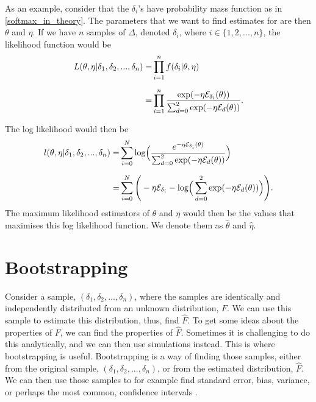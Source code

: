 As an example, consider that the $\delta_i$'s have probability mass function as in \eqref{softmax_in_theory}. The parameters that we want to find estimates for are then $\theta$ and $\eta$. If we have $n$ samples of $\Delta$, denoted $\delta_i$, where $i \in \{1,2,...,n\}$,
the likelihood function would be
\begin{equation*}
    \begin{aligned}
        L(\theta,\eta|\delta_1,\delta_2,...,\delta_n) 
        =& \prod_{i=1}^{n} f(\delta_i|\theta,\eta)\\[6pt]
        =& \prod_{i=1}^{n}
        \frac{\text{exp}(- \eta \mathcal{E}_{\delta_i}(\theta))}{\sum_{d=0}^{2} \text{exp}(-\eta \mathcal{E}_{d}(\theta))}.
    \end{aligned}
\end{equation*}

The log likelihood would then be
\begin{equation*}
    \begin{aligned}
        l(\theta,\eta|\delta_1,\delta_2,...,\delta_n) =& \sum_{i=0}^N \text{log}\Big( \frac{e^{-\eta \mathcal{E}_{\delta_{i}}(\theta)}}
        {\sum_{d=0}^{2} \text{exp}(-\eta \mathcal{E}_{d}(\theta))}\Big) \\[6pt]
        =& \sum_{i=0}^N \Bigg(
        -\eta \mathcal{E}_{\delta_{i}} 
        - \text{log}\Big(\sum_{d=0}^{2} \text{exp}(-\eta \mathcal{E}_{d}(\theta))\Big) \Bigg).
    \end{aligned}
\end{equation*}
The maximum likelihood estimators of $\theta$ and $\eta$ would then be the values that maximises this log likelihood function. We denote them as $\hat{\theta}$ and $\hat{\eta}$.




\section{Bootstrapping}
\label{section_theory_bootstrap}
Consider a sample, $(\delta_1,\delta_2,...,\delta_n)$, where the samples are identically and independently distributed from an unknown distribution, $F$. We can use this sample to estimate this distribution, thus, find $\hat{F}$. To get some ideas about the properties of $F$, we can find the properties of $\hat{F}$. Sometimes it is challenging to do this analytically, and we can then use simulations instead. This is where bootstrapping is useful. Bootstrapping is a way of finding those samples, either from the original sample, $(\delta_1,\delta_2,...,\delta_n)$, or from the estimated distribution, $\hat{F}$. We can then use those samples to for example find standard error, bias, variance, or perhaps the most common, confidence intervals \citep{bootstrap}.


